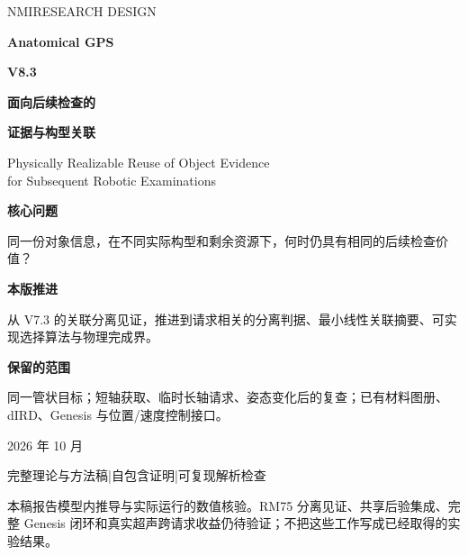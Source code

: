 \documentclass[UTF8,11pt,a4paper,fontset=fandol]{ctexart}
\numberwithin{equation}{section}
\theoremstyle{definition}
\begin{document}
\begin{titlepage}
\vspace*{6mm}
{\Large\color{teal}\sffamily NMI\quad RESEARCH DESIGN}\par
\vspace{11mm}
{\fontsize{32}{40}\selectfont\bfseries\color{ink}Anatomical GPS}\par
\vspace{3mm}
{\fontsize{25}{33}\selectfont\bfseries\color{ink}V8.3}\par
\vspace{9mm}
{\LARGE\bfseries 面向后续检查的}\par
\vspace{2mm}
{\LARGE\bfseries 证据与构型关联}\par
\vspace{6mm}
{\large\color{muted}Physically Realizable Reuse of Object Evidence\\
for Subsequent Robotic Examinations}\par
\vspace{9mm}
\begin{keybox}
\textbf{核心问题}\par
同一份对象信息，在不同实际构型和剩余资源下，何时仍具有相同的后续检查价值？
\medskip\par
\textbf{本版推进}\par
从 V7.3 的关联分离见证，推进到请求相关的分离判据、最小线性关联摘要、可实现选择算法与物理完成界。
\medskip\par
\textbf{保留的范围}\par
同一管状目标；短轴获取、临时长轴请求、姿态变化后的复查；已有材料图册、dIRD、Genesis 与位置/速度控制接口。
\end{keybox}
\vfill
{\large 2026 年 10 月}\par
\vspace{3mm}
{\color{muted}完整理论与方法稿\quad|\quad 自包含证明\quad|\quad 可复现解析检查}\par
\vspace{3mm}
{\small 本稿报告模型内推导与实际运行的数值核验。RM75 分离见证、共享后验集成、完整 Genesis 闭环和真实超声跨请求收益仍待验证；不把这些工作写成已经取得的实验结果。}
\end{titlepage}
\end{document}
